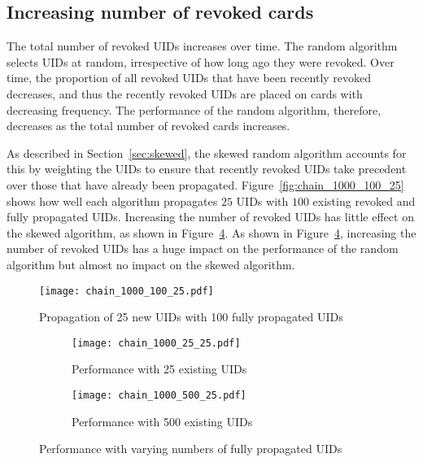\documentclass[dissertation.tex]{subfiles}
\begin{document}
  \subsection{Increasing number of revoked cards}

  The total number of revoked UIDs increases over time. The random algorithm selects UIDs at random, irrespective of how long ago they were revoked. Over time, the proportion of all revoked UIDs that have been recently revoked decreases, and thus the recently revoked UIDs are placed on cards with decreasing frequency. The performance of the random algorithm, therefore, decreases as the total number of revoked cards increases.

  As described in Section~\ref{sec:skewed}, the skewed random algorithm accounts for this by weighting the UIDs to ensure that recently revoked UIDs take precedent over those that have already been propagated. Figure~\vref{fig:chain_1000_100_25} shows how well each algorithm propagates $25$ UIDs with $100$ existing revoked and fully propagated UIDs. Increasing the number of revoked UIDs has little effect on the skewed algorithm, as shown in Figure~\ref{fig:chain_1000}. As shown in Figure~\ref{fig:chain_1000}, increasing the number of revoked UIDs has a huge impact on the performance of the random algorithm but almost no impact on the skewed algorithm.

  \begin{figure}[p]
    \centering
    \texttt{[image: chain\_1000\_100\_25.pdf]}
    \caption{Propagation of 25 new UIDs with 100 fully propagated UIDs}\label{fig:chain_1000_100_25}
  \end{figure}


  \begin{figure}[p]
  \centering
  \begin{subfigure}{.5\textwidth}
    \centering
    \texttt{[image: chain\_1000\_25\_25.pdf]}
    \caption{Performance with 25 existing UIDs}\label{fig:chain_1000_25_25}
  \end{subfigure}%
  \begin{subfigure}{.5\textwidth}
    \centering
    \texttt{[image: chain\_1000\_500\_25.pdf]}
    \caption{Performance with 500 existing UIDs}\label{fig:chain_1000_500_25}
  \end{subfigure}%
  \caption{Performance with varying numbers of fully propagated UIDs}\label{fig:chain_1000}
  \end{figure}

  \pagebreak
\end{document}

